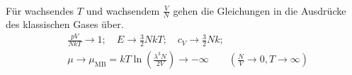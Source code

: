 \begin{enumerate}[A)]
\begin{enumerate}[i)]
\begin{equation}
\begin{split}
            \end{split}
        \end{equation}
        Für wachsendes $T$ und wachsendem $\frac{V}{N}$ gehen die Gleichungen in die Ausdrücke des klassischen Gases über.
        \begin{equation}
            \begin{split}
                & \frac{p V}{N k T} \to 1; \quad E \to \frac{3}{2} N k T; \quad c_V \to \frac{3}{2} N k; \\
                & \mu \to \mu_\text{MB} = k T \ln \left( \frac{\lambda^3 N}{2 V} \right) \to - \infty \qquad \left( \frac{N}{V} \to 0, T \to \infty \right) 
            \end{split}
        \end{equation}
    \end{enumerate}
\end{enumerate}